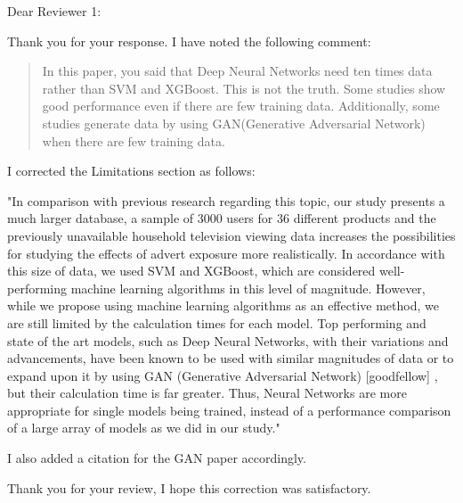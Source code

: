 \documentclass[review]{elsarticle}
\begin{document}
Dear Reviewer 1:

Thank you for your response. I have noted the following comment:

\begin{quotation}
In this paper, you said that Deep Neural Networks need ten times data rather than SVM and XGBoost.
This is not the truth.
Some studies show good performance even if there are few training data.
Additionally, some studies generate data by using GAN(Generative Adversarial Network) when there are few training data.
\end{quotation}


I corrected the Limitations section as follows:

"In comparison with previous research regarding this topic, our study presents a much larger database, a sample of 3000 users for 36 different products and the previously unavailable household television viewing data increases the possibilities for studying the effects of advert exposure more realistically. In accordance with this size of data, we used SVM and XGBoost, which are considered well-performing machine learning algorithms in this level of magnitude. However, while we propose using machine learning algorithms as an effective method, we are still limited by the calculation times for each model. Top performing and state of the art models, such as Deep Neural Networks, with their variations and advancements, have been known to be used with similar magnitudes of data or to expand upon it by using GAN (Generative Adversarial Network) [goodfellow] , but their calculation time is far greater. Thus, Neural Networks are more appropriate for single models being trained, instead of a performance comparison of a large array of models as we did in our study."




I also added a citation for the GAN paper accordingly. 

Thank you for your review, I hope this correction was satisfactory.
\end{document}
